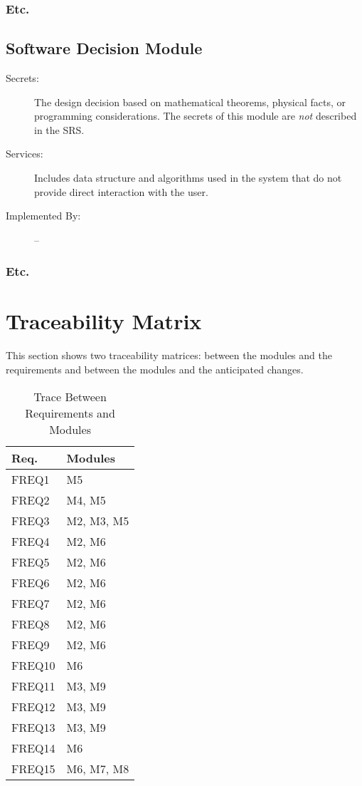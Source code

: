 \documentclass[12pt, titlepage]{article}
\begin{document}
\subsubsection{Etc.}


\subsection{Software Decision Module}

\begin{description}
\item[Secrets:] The design decision based on mathematical theorems, physical
  facts, or programming considerations. The secrets of this module are
  \emph{not} described in the SRS.
\item[Services:] Includes data structure and algorithms used in the system that
  do not provide direct interaction with the user. 
\item[Implemented By:] --
\end{description}

\subsubsection{Etc.}

\section{Traceability Matrix} \label{SecTM}

This section shows two traceability matrices: between the modules and the
requirements and between the modules and the anticipated changes.

\begin{table}[H]
\centering
\begin{tabular}{p{} p{}}
\toprule
\textbf{Req.} & \textbf{Modules}\\
\midrule
FREQ1 & M5\\
FREQ2 & M4, M5\\
FREQ3 & M2, M3, M5\\
FREQ4 & M2, M6\\
FREQ5 & M2, M6\\
FREQ6 & M2, M6\\
FREQ7 & M2, M6\\
FREQ8 & M2, M6\\
FREQ9 & M2, M6\\
FREQ10 & M6\\
FREQ11 & M3, M9\\
FREQ12 & M3, M9\\
FREQ13 & M3, M9\\
FREQ14 & M6\\
FREQ15 & M6, M7, M8\\
\bottomrule
\end{tabular}
\caption{Trace Between Requirements and Modules}
\label{TblRT}
\end{table}
\end{document}

